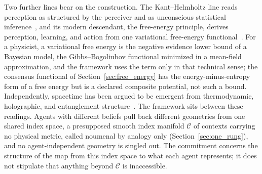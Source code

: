 \documentclass[11pt]{article}
\begin{document}
Two further lines bear on the construction. The Kant--Helmholtz line reads perception as structured by the perceiver and as unconscious statistical inference~\cite{Kant1781, Helmholtz1867}, and its modern descendant, the free-energy principle, derives perception, learning, and action from one variational free-energy functional~\cite{Friston2010, Friston2017, parr2022active}. For a physicist, a variational free energy is the negative evidence lower bound of a Bayesian model, the Gibbs--Bogoliubov functional minimized in a mean-field approximation, and the framework uses the term only in that technical sense; the consensus functional of Section~\ref{sec:free_energy} has the energy-minus-entropy form of a free energy but is a declared composite potential, not such a bound. Independently, spacetime has been argued to be emergent from thermodynamic, holographic, and entanglement structure~\cite{Jacobson1995, Padmanabhan2010, Bousso2002, Maldacena1999, VanRaamsdonk2010, MaldacenaSusskind2013, Swingle2012}. The framework sits between these readings. Agents with different beliefs pull back different geometries from one shared index space, a presupposed smooth index manifold $\mathcal{C}$ of contexts carrying no physical metric, called noumenal by analogy only (Section~\ref{sec:one_rung}), and no agent-independent geometry is singled out. The commitment concerns the structure of the map from this index space to what each agent represents; it does not stipulate that anything beyond $\mathcal{C}$ is inaccessible.
\end{document}
